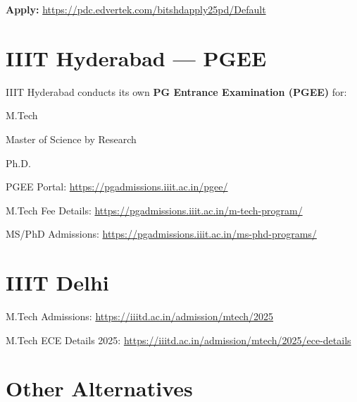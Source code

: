 \noindent\textbf{Apply:} \url{https://pdc.edvertek.com/bitshdapply25pd/Default}

\section{IIIT Hyderabad --- PGEE}
\label{sec:iiith}

IIIT Hyderabad conducts its own \textbf{PG Entrance Examination (PGEE)} for:

\begin{pfChecklist}
  \item M.Tech
  \item Master of Science by Research
  \item Ph.D.
\end{pfChecklist}

\begin{pfActionList}
  \item PGEE Portal: \url{https://pgadmissions.iiit.ac.in/pgee/}
  \item M.Tech Fee Details:
        \url{https://pgadmissions.iiit.ac.in/m-tech-program/}
  \item MS/PhD Admissions:
        \url{https://pgadmissions.iiit.ac.in/ms-phd-programs/}
\end{pfActionList}

\section{IIIT Delhi}
\label{sec:iiitd}

\begin{pfActionList}
  \item M.Tech Admissions: \url{https://iiitd.ac.in/admission/mtech/2025}
  \item M.Tech ECE Details 2025:
        \url{https://iiitd.ac.in/admission/mtech/2025/ece-details}
\end{pfActionList}

\section{Other Alternatives}
\label{sec:other-alternatives}

